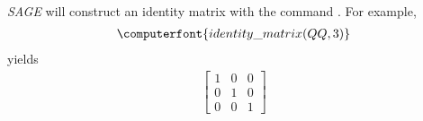 \contributedby{\stevecanfield}\\
%
{\sl SAGE} will construct an identity matrix with the command .  For example,
%
\begin{align*}
\computerfont{identity\_matrix(QQ, 3)}
\end{align*}
%
yields
%
\begin{align*}
\begin{bmatrix}
1 & 0 & 0 \\
0 & 1 & 0 \\
0 & 0 & 1
\end{bmatrix}
\end{align*}